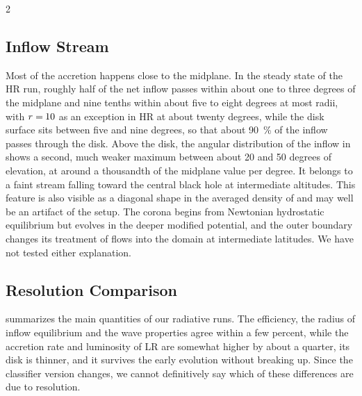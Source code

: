 \begin{multicols}{2}


	\subsection{Inflow Stream}

	Most of the accretion happens close to the midplane. In the steady state of the HR run, roughly half of the net inflow passes within
	about one to three degrees of the midplane and nine tenths within about five to eight degrees at most radii, with $r = {\kern-0.5pt}10$
	as an exception in HR at about twenty degrees, while the disk surface sits between five and nine degrees, so that about \qty{90}{\percent}
	of the inflow passes through the disk. Above the disk, the angular distribution of the inflow in  shows a second,
	much weaker maximum between about \num{20} and \num{50} degrees of elevation, at around a thousandth of the midplane value per degree.
	It belongs to a faint stream falling toward the central black hole at intermediate altitudes.
	This feature is also visible as a diagonal shape in the averaged density of  and may well be an artifact of the setup.
	The corona begins from Newtonian hydrostatic equilibrium but evolves in the deeper modified potential, and the outer boundary changes its
	treatment of flows into the domain at intermediate latitudes. We have not tested either explanation.

	\subsection{Resolution Comparison}

	 summarizes the main quantities of our radiative runs. The efficiency, the radius of inflow equilibrium and the wave
	properties agree within a few percent, while the accretion rate and luminosity of LR are somewhat higher by about a quarter, its disk is
	thinner, and it survives the early evolution without breaking up. Since the classifier version changes, we cannot definitively say which
	of these differences are due to resolution.


\end{multicols}
